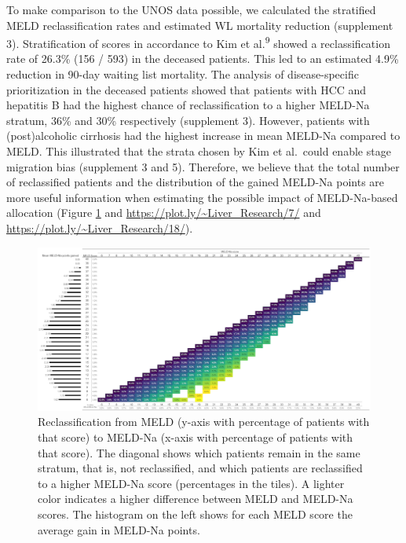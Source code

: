 \documentclass[11pt,english,]{book} %
\begin{document}
To make comparison to the UNOS data possible, we calculated the stratified MELD reclassification rates and estimated WL mortality reduction (supplement 3). Stratification of scores in accordance to Kim et al.\textsuperscript{9} showed a reclassification rate of 26.3\% (156 / 593) in the deceased patients. This led to an estimated 4.9\% reduction in 90-day waiting list mortality. The analysis of disease-specific prioritization in the deceased patients showed that patients with HCC and hepatitis B had the highest chance of reclassification to a higher MELD-Na stratum, 36\% and 30\% respectively (supplement 3). However, patients with (post)alcoholic cirrhosis had the highest increase in mean MELD-Na compared to MELD. This illustrated that the strata chosen by Kim et al.~could enable stage migration bias (supplement 3 and 5). Therefore, we believe that the total number of reclassified patients and the distribution of the gained MELD-Na points are more useful information when estimating the possible impact of MELD-Na-based allocation (Figure \ref{fig:meldna-fig8} and \url{https://plot.ly/~Liver_Research/7/} and \url{https://plot.ly/~Liver_Research/18/}).

\begin{figure}
\includegraphics[angle=90]{figures/meldna/figure 8. Reclassification and gained points histogram 2} \caption{Reclassification from MELD (y-axis with percentage of patients with that score) to MELD-Na (x-axis with percentage of patients with that score). The diagonal shows which patients remain in the same stratum, that is, not reclassified, and which patients are reclassified to a higher MELD-Na score (percentages in the tiles). A lighter color indicates a higher difference between MELD and MELD-Na scores. The histogram on the left shows for each MELD score the average gain in MELD-Na points.}\label{fig:meldna-fig8}
\end{figure}
\end{document}
